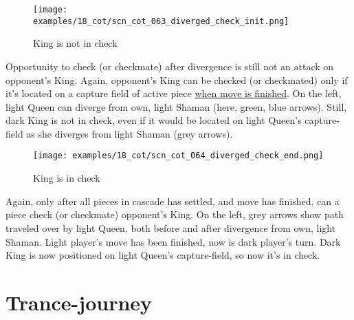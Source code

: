 \vspace*{-0.7\baselineskip}
\noindent
\begin{wrapfigure}[14]{l}{0.4\textwidth}
\centering
\texttt{[image: examples/18\_cot/scn\_cot\_063\_diverged\_check\_init.png]}
\vspace*{-0.4\baselineskip}
\caption{King is not in check}
\label{fig:scn_cot_063_diverged_check_init}
\end{wrapfigure}
Opportunity to check (or checkmate) after divergence is still not an attack on
opponent's King. Again, opponent's King can be checked (or checkmated) only if
it's located on a capture field of active piece
\hyperref[fig:scn_mv_49_activating_piece_check_init]{when move is finished}.\newline
\indent
On the left, light Queen can diverge from own, light Shaman (here, green, blue
arrows). Still, dark King is not in check, even if it would be located on light
Queen's capture-field as she diverges from light Shaman (grey arrows).

\vspace*{0.4\baselineskip}
\noindent
\begin{wrapfigure}[13]{l}{0.4\textwidth}
\centering
\texttt{[image: examples/18\_cot/scn\_cot\_064\_diverged\_check\_end.png]}
\vspace*{-0.4\baselineskip}
\caption{King is in check}
\label{fig:scn_cot_064_diverged_check_end}
\end{wrapfigure}
Again, only after all pieces in cascade has settled, and move has finished, can
a piece check (or checkmate) opponent's King.\newline
\indent
On the left, grey arrows show path traveled over by light Queen, both before
and after divergence from own, light Shaman. Light player's move has been
finished, now is dark player's turn. Dark King is now positioned on light
Queen's capture-field, so now it's in check.

\clearpage %

\section*{Trance-journey}
\label{sec:Conquest of Tlalocan/Trance-journey}

